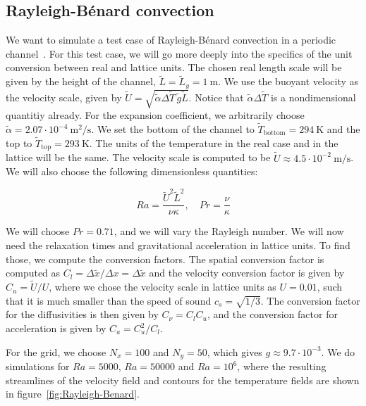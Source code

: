 \subsection{Rayleigh-Bénard convection}
We want to simulate a test case of Rayleigh-Bénard convection in a periodic channel~\cite{Rayleigh}. For this test case, we will go more deeply into the specifics of the unit conversion between real and lattice units. The chosen real length scale will be given by the height of the channel, $\widetilde{L} = \widetilde{L}_y = 1~\text{m}$. We use the buoyant velocity as the velocity scale, given by $\widetilde{U} = \sqrt{\widetilde{\alpha}\Delta\widetilde{T}\, \widetilde{g}\widetilde{L}}$. Notice that $\widetilde{\alpha}\Delta\widetilde{T}$ is a nondimensional quantitiy already. For the expansion coefficient, we arbitrarily choose $\widetilde{\alpha} = 2.07 \cdot 10^{-4}~\text{m}^2/\text{s}$. We set the bottom of the channel to $\widetilde{T}_{\text{bottom}} = 294~\text{K}$ and the top to $\widetilde{T}_{\text{top}} = 293~\text{K}$. The units of the temperature in the real case and in the lattice will be the same. The velocity scale is computed to be $\widetilde{U} \approx 4.5 \cdot 10^{-2}~\text{m}/\text{s}$. We will also choose the following dimensionless quantities:

\begin{equation}
    \textit{Ra} = \frac{\widetilde{U}^2 \widetilde{L}^2}{\nu \kappa},\quad \textit{Pr} = \frac{\nu}{\kappa}
\end{equation}

We will choose $\textit{Pr} = 0.71$, and we will vary the Rayleigh number. We will now need the relaxation times and gravitational acceleration in lattice units. To find those, we compute the conversion factors. The spatial conversion factor is computed as $C_l = \Delta \widetilde{x} / \Delta x = \Delta \widetilde{x}$ and the velocity conversion factor is given by $C_u = \widetilde{U} / U$, where we chose the velocity scale in lattice units as $U = 0.01$, such that it is much smaller than the speed of sound $c_s = \sqrt{1/3}$. The conversion factor for the diffusivities is then given by $C_\nu = C_l C_u$, and the conversion factor for acceleration is given by $C_a = C_u^2 / C_l$. 

For the grid, we choose $N_x = 100$ and $N_y = 50$, which gives $g \approx 9.7 \cdot 10^{-3}$. We do simulations for $\textit{Ra} = 5000$, $\textit{Ra} = 50000$ and $\textit{Ra} = 10^6$, where the resulting streamlines of the velocity field and contours for the temperature fields are shown in figure~\ref{fig:Rayleigh-Benard}. 

